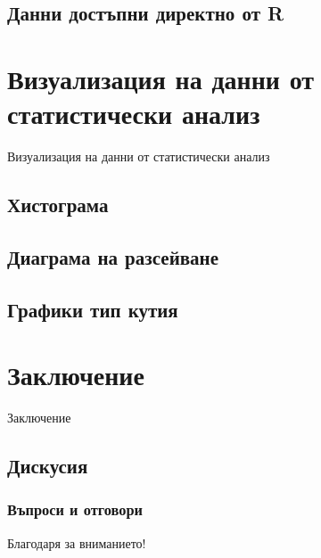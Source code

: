\documentclass{beamer}
\begin{document}
\subsection{Данни достъпни директно от R}

\section{Визуализация на данни от статистически анализ}

\begin{frame}
\center \huge{Визуализация на данни от статистически анализ}
\end{frame}

\subsection{Хистограма}

\subsection{Диаграма на разсейване}

\subsection{Графики тип кутия}

\section{Заключение}

\begin{frame}
\center \huge{Заключение}
\end{frame}

\subsection{Дискусия}

\begin{frame}
\frametitle{Въпроси и отговори}
\center \huge{Благодаря за вниманието!}
\end{frame}
\end{document}

